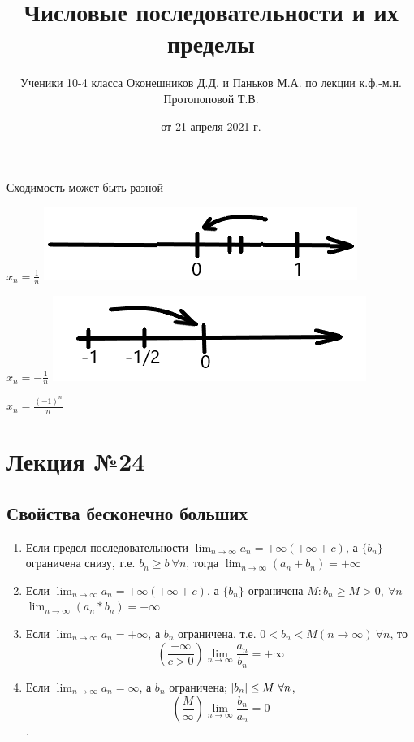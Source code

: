 \documentclass{article}
\begin{document}
\begin{enumerate}
    Сходимость может быть разной

    \(x_n = \frac{1}{n}\)
    \qquad \includegraphics[scale=0.3]{22_0}

    \(x_n = -\frac{1}{n}\)
    \qquad \includegraphics[scale=0.3]{22_1}

    \(x_n = \frac{(-1)^n}{n}\)
    
\end{enumerate}
    \title{Числовые последовательности и их пределы}
    \author{Ученики 10-4 класса Оконешников Д.Д. и Паньков М.А. по лекции к.ф.-м.н. Протопоповой Т.В.}
    \date{от 21 апреля 2021 г.}
    \maketitle

    \section{Лекция №24}
    \subsection{Свойства бесконечно больших}

    \begin{enumerate}
        \item Если предел последовательности \( \lim_{n \rightarrow \infty }a_n = + \infty \)\( (+\infty + c) \), а \( \{b_n\} \) ограничена снизу, т.е. \( b_n \geq b\ \forall n \), тогда \(\lim_{n \rightarrow \infty}{(a_n + b_n)} = +\infty\)
       
        \item Если \( \lim_{n \rightarrow \infty }a_n = + \infty \)\( (+\infty + c) \), а \( \{b_n\} \) ограничена \( M: b_n \geq M > 0,\ \forall n \)
    \(\lim_{n \rightarrow \infty}{(a_n * b_n)} = +\infty\)

        \item Если \( \lim_{n \rightarrow \infty }a_n = +\infty \), а \( b_n \) ограничена, т.е. \( 0 < b_n < M (n \rightarrow \infty)\ \forall n \), то \[ (\frac{+\infty}{c > 0}) \lim_{n \rightarrow \infty}{\frac{a_n}{b_n}} = +\infty\]
    
        \item Если \(\lim_{n \rightarrow \infty}{a_n} = \infty\), а \(b_n\) ограничена; \(\abs{b_n} \leq M\  \forall n\), \[ (\frac{M}{\infty}) \lim_{n \rightarrow \infty }\frac{b_n}{a_n} = 0 \].
    \end{enumerate}
\end{document}
